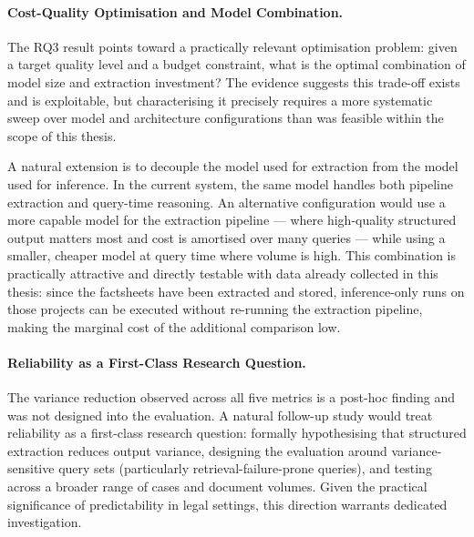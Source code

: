 \paragraph{Cost-Quality Optimisation and Model Combination.}
The RQ3 result points toward a practically relevant optimisation problem: given a target quality level and a budget constraint, what is the optimal combination of model size and extraction investment? The evidence suggests this trade-off exists and is exploitable, but characterising it precisely requires a more systematic sweep over model and architecture configurations than was feasible within the scope of this thesis.

A natural extension is to decouple the model used for extraction from the model used for inference. In the current system, the same model handles both pipeline extraction and query-time reasoning. An alternative configuration would use a more capable model for the extraction pipeline --- where high-quality structured output matters most and cost is amortised over many queries --- while using a smaller, cheaper model at query time where volume is high. This combination is practically attractive and directly testable with data already collected in this thesis: since the factsheets have been extracted and stored, inference-only runs on those projects can be executed without re-running the extraction pipeline, making the marginal cost of the additional comparison low.

\paragraph{Reliability as a First-Class Research Question.}
The variance reduction observed across all five metrics is a post-hoc finding and was not designed into the evaluation. A natural follow-up study would treat reliability as a first-class research question: formally hypothesising that structured extraction reduces output variance, designing the evaluation around variance-sensitive query sets (particularly retrieval-failure-prone queries), and testing across a broader range of cases and document volumes. Given the practical significance of predictability in legal settings, this direction warrants dedicated investigation.

